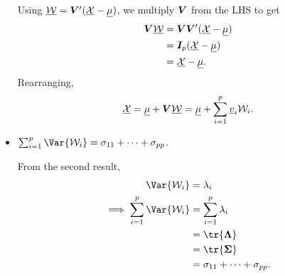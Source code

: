 \begin{itemize}
\begin{framed}
                  Using $ \underline{\mathcal{W}}=\bm{V}'(\underline{\mathcal{X}}-\underline{\mu}) $, we multiply $ \bm{V} $ from the LHS to get
                  \begin{align*}
                        \bm{V}\underline{\mathcal{W}} & =\bm{V}\bm{V}'(\underline{\mathcal{X}}-\underline{\mu}) \\
                                              & =\bm{I}_p(\underline{\mathcal{X}}-\underline{\mu})          \\
                                              & =\underline{\mathcal{X}}-\underline{\mu}.
                  \end{align*}
                  Rearranging,
                  \[ \underline{\mathcal{X}}=\underline{\mu}+\bm{V}\underline{\mathcal{W}}=\underline{\mu}+\sum_{i=1}^{p}\underline{v}_i \mathcal{W}_i. \]
            \end{framed}
      \item $ \sum_{i=1}^{p}\Var{\RV{W}_i}=\sigma_{11}+\cdots+\sigma_{pp} $.
            \begin{framed}
                  From the second result,
                  \begin{align*}
                        \Var{\RV{W}_i}                        & =\lambda_i                       \\
                        \implies \sum_{i=1}^{p}\Var{\RV{W}_i} & =\sum_{i=1}^{p}\lambda_i         \\
                                                              & =\tr{\Matrix{\Lambda}}           \\
                                                              & =\tr{\Matrix{\Sigma}}            \\
                                                              & =\sigma_{11}+\cdots+\sigma_{pp}.
                  \end{align*}
            \end{framed}
\end{itemize}
